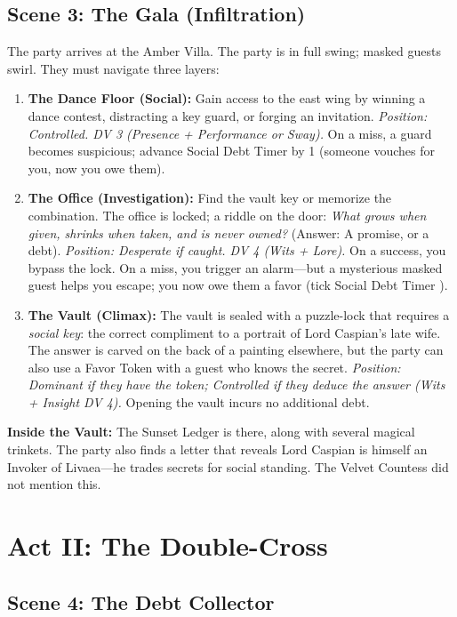 \documentclass[12pt]{book}
\begin{document}
\section{Scene 3: The Gala (Infiltration)}

The party arrives at the Amber Villa. The party is in full swing; masked guests swirl. They must navigate three layers:

\begin{enumerate}
    \item \textbf{The Dance Floor (Social):} Gain access to the east wing by winning a dance contest, distracting a key guard, or forging an invitation. \textit{Position: Controlled. DV 3 (Presence + Performance or Sway).} On a miss, a guard becomes suspicious; advance Social Debt Timer by 1 (someone vouches for you, now you owe them).
    \item \textbf{The Office (Investigation):} Find the vault key or memorize the combination. The office is locked; a riddle on the door: \textit{What grows when given, shrinks when taken, and is never owned?} (Answer: A promise, or a debt). \textit{Position: Desperate if caught. DV 4 (Wits + Lore).} On a success, you bypass the lock. On a miss, you trigger an alarm---but a mysterious masked guest helps you escape; you now owe them a favor (tick Social Debt Timer ).
    \item \textbf{The Vault (Climax):} The vault is sealed with a puzzle-lock that requires a \textit{social key}: the correct compliment to a portrait of Lord Caspian's late wife. The answer is carved on the back of a painting elsewhere, but the party can also use a Favor Token with a guest who knows the secret. \textit{Position: Dominant if they have the token; Controlled if they deduce the answer (Wits + Insight DV 4).} Opening the vault incurs no additional debt.
\end{enumerate}

\textbf{Inside the Vault:} The Sunset Ledger is there, along with several magical trinkets. The party also finds a letter that reveals Lord Caspian is himself an Invoker of Livaea---he trades secrets for social standing. The Velvet Countess did not mention this.

\chapter{Act II: The Double-Cross}

\section{Scene 4: The Debt Collector}
\end{document}
